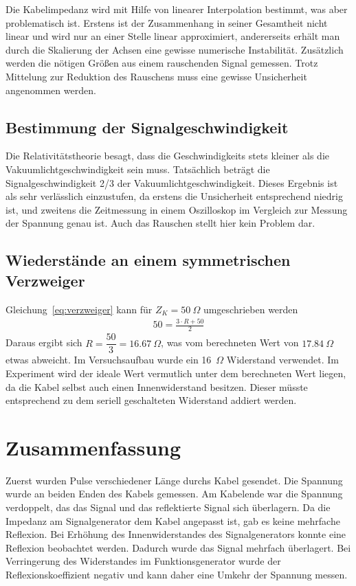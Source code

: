 \documentclass{article}
\begin{document}
Die Kabelimpedanz wird mit Hilfe von linearer Interpolation bestimmt, was aber problematisch ist. Erstens ist der Zusammenhang in seiner Gesamtheit nicht linear und wird nur an einer Stelle linear approximiert, andererseits erhält man durch die Skalierung der Achsen eine gewisse numerische Instabilität. Zusätzlich werden die nötigen Größen aus einem rauschenden Signal gemessen. Trotz Mittelung zur Reduktion des Rauschens muss eine gewisse Unsicherheit angenommen werden.



\subsection{Bestimmung der Signalgeschwindigkeit}

Die Relativitätstheorie besagt, dass die Geschwindigkeits stets kleiner als die Vakuumlichtgeschwindigkeit sein muss. Tatsächlich beträgt die Signalgeschwindigkeit 2/3 der Vakuumlichtgeschwindigkeit. Dieses Ergebnis ist als sehr verlässlich einzustufen, da erstens die Unsicherheit entsprechend niedrig ist, und zweitens die Zeitmessung in einem Oszilloskop im Vergleich zur Messung der Spannung genau ist. Auch das Rauschen stellt hier kein Problem dar.

\subsection{Wiederstände an einem symmetrischen Verzweiger}

Gleichung~\eqref{eq:verzweiger} kann für $Z_K = 50~\Omega$ umgeschrieben werden
\begin{align*}
50 = \frac{3\cdot R + 50}{2}
\end{align*}
Daraus ergibt sich $R = \dfrac{50}{3} = 16.67~\Omega$, was vom berechneten Wert von $17.84~\Omega$ etwas abweicht. Im Versuchsaufbau wurde ein 16~$\Omega$ Widerstand verwendet. Im Experiment wird der ideale Wert vermutlich unter dem berechneten Wert liegen, da die Kabel selbst auch einen Innenwiderstand besitzen. Dieser müsste entsprechend zu dem seriell geschalteten Widerstand addiert werden.


\section{Zusammenfassung}

Zuerst wurden Pulse verschiedener Länge durchs Kabel gesendet. Die Spannung wurde an beiden Enden des Kabels gemessen. Am Kabelende war die Spannung verdoppelt, das das Signal und das reflektierte Signal sich überlagern. Da die Impedanz am Signalgenerator dem Kabel angepasst ist, gab es keine mehrfache Reflexion. Bei Erhöhung des Innenwiderstandes des Signalgenerators konnte eine Reflexion beobachtet werden. Dadurch wurde das Signal mehrfach überlagert. Bei Verringerung des Widerstandes im Funktionsgenerator wurde der Reflexions\-koeffizient negativ und kann daher eine Umkehr der Spannung messen.
\end{document}
